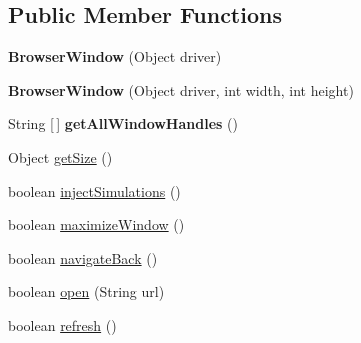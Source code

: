 \subsection*{Public Member Functions}
\begin{DoxyCompactItemize}
\item 
\hypertarget{classcom_1_1zeuslearning_1_1automation_1_1selenium_1_1interactions_1_1BrowserWindow_aa71f0962cb810c1d9aca3e18eb2ff08e}{}\label{classcom_1_1zeuslearning_1_1automation_1_1selenium_1_1interactions_1_1BrowserWindow_aa71f0962cb810c1d9aca3e18eb2ff08e} 
{\bfseries Browser\+Window} (Object driver)
\item 
\hypertarget{classcom_1_1zeuslearning_1_1automation_1_1selenium_1_1interactions_1_1BrowserWindow_a86c3612ee0fc3b3c27ab0b8ec215d2a7}{}\label{classcom_1_1zeuslearning_1_1automation_1_1selenium_1_1interactions_1_1BrowserWindow_a86c3612ee0fc3b3c27ab0b8ec215d2a7} 
{\bfseries Browser\+Window} (Object driver, int width, int height)
\item 
\hypertarget{classcom_1_1zeuslearning_1_1automation_1_1selenium_1_1interactions_1_1BrowserWindow_a70b259da018c4385fcd029f536acb379}{}\label{classcom_1_1zeuslearning_1_1automation_1_1selenium_1_1interactions_1_1BrowserWindow_a70b259da018c4385fcd029f536acb379} 
String \mbox{[}$\,$\mbox{]} {\bfseries get\+All\+Window\+Handles} ()
\item 
Object \hyperlink{classcom_1_1zeuslearning_1_1automation_1_1selenium_1_1interactions_1_1BrowserWindow_a018371a31ff443e6e1c192862b1a8a29}{get\+Size} ()
\item 
boolean \hyperlink{classcom_1_1zeuslearning_1_1automation_1_1selenium_1_1interactions_1_1BrowserWindow_afd940a0c96c58bdedd01c1df95933852}{inject\+Simulations} ()
\item 
boolean \hyperlink{classcom_1_1zeuslearning_1_1automation_1_1selenium_1_1interactions_1_1BrowserWindow_a446ec66dd4fb469961b7242a9b0c1a35}{maximize\+Window} ()
\item 
boolean \hyperlink{classcom_1_1zeuslearning_1_1automation_1_1selenium_1_1interactions_1_1BrowserWindow_ac680899d66b9d544bed94dc3de808559}{navigate\+Back} ()
\item 
boolean \hyperlink{classcom_1_1zeuslearning_1_1automation_1_1selenium_1_1interactions_1_1BrowserWindow_a0944339f910fc20bbb074e393270c9cc}{open} (String url)
\item 
boolean \hyperlink{classcom_1_1zeuslearning_1_1automation_1_1selenium_1_1interactions_1_1BrowserWindow_ae774d056dd47837cc8b4c62e5fa8826a}{refresh} ()
\item 

\end{DoxyCompactItemize}
